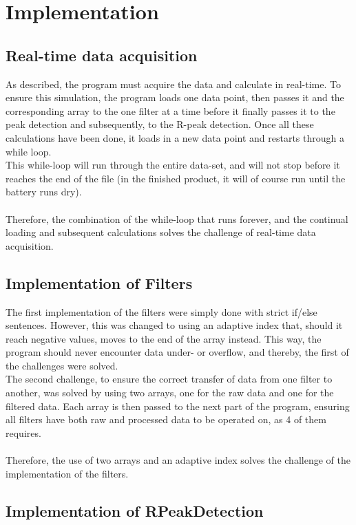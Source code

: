 \documentclass[12pt,a4paper]{article}
\begin{document}
\section{Implementation}
\subsection{Real-time data acquisition}
	As described, the program must acquire the data and calculate in real-time. To ensure this simulation, the program loads one data point, then passes it and the corresponding array to the one filter at a time before it finally passes it to the peak detection and subsequently, to the R-peak detection. Once all these calculations have been done, it loads in a new data point and restarts through a while loop.\\
	This while-loop will run through the entire data-set, and will not stop before it reaches the end of the file (in the finished product, it will of course run until the battery runs dry).\\
	\\
	Therefore, the combination of the while-loop that runs forever, and the continual loading and subsequent calculations solves the challenge of real-time data acquisition.\\

\subsection{Implementation of Filters}
	The first implementation of the filters were simply done with strict if/else sentences. However, this was changed to using an adaptive index that, should it reach negative values, moves to the end of the array instead. This way, the program should never encounter data under- or overflow, and thereby, the first of the challenges were solved.\\
	The second challenge, to ensure the correct transfer of data from one filter to another, was solved by using two arrays, one for the raw data and one for the filtered data. Each array is then passed to the next part of the program, ensuring all filters have both raw and processed data to be operated on, as 4 of them requires.\\
	\\
	Therefore, the use of two arrays and an adaptive index solves the challenge of the implementation of the filters.\\
	
\subsection{Implementation of RPeakDetection}
	
\end{document}
